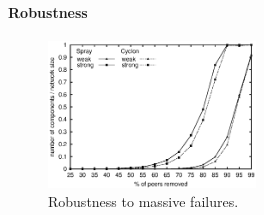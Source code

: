 \paragraph{Robustness}

\begin{figure}
  \centering
  \includegraphics[width=0.49\textwidth]{img/resilience.eps}
  \caption{\label{fig:resilience}Robustness to massive failures.}
\end{figure}

